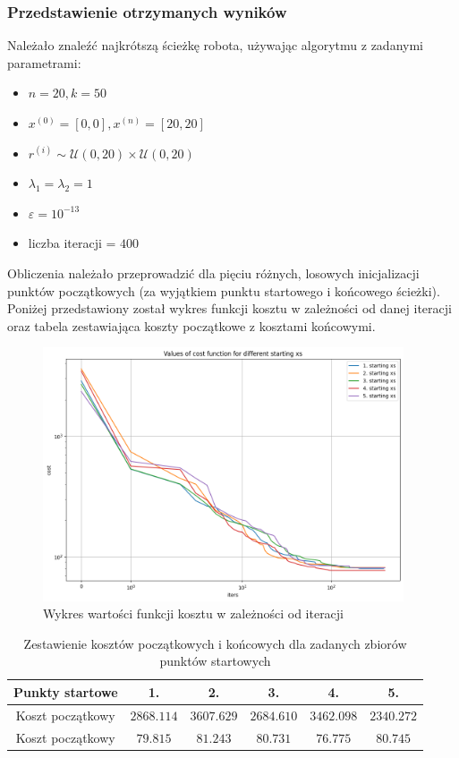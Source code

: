 \documentclass{article}
\begin{document}
\subsubsection{Przedstawienie otrzymanych wyników}
Należało znaleźć najkrótszą ścieżkę robota, używając algorytmu z zadanymi parametrami:
\begin{itemize}
\item $n=20, k=50$
\item $x^{(0)} = [0,0], x^{(n)} = [20,20]$
\item $r^{(i)} \sim \mathcal U(0,20) \times \mathcal U(0,20)$
\item $\lambda_1 = \lambda_2 = 1$
\item $\varepsilon = 10^{-13}$
\item liczba iteracji = $400$
\end{itemize}
Obliczenia należało przeprowadzić dla pięciu różnych, losowych inicjalizacji punktów początkowych (za wyjątkiem punktu startowego i końcowego ścieżki). Poniżej przedstawiony został wykres funkcji kosztu w zależności od danej iteracji oraz tabela zestawiająca koszty początkowe z kosztami końcowymi.
\begin{figure}[H]
    \centering
    \includegraphics[width=0.95\textwidth]{1}
    \caption{Wykres wartości funkcji kosztu w zależności od iteracji}
    \label{fig:mesh}
\end{figure}
\begin{table}[h!]
    \centering
    \begin{tabular}{|c|ccccc|}
        \hline
        Punkty startowe & 1. & 2. & 3. & 4. & 5. \\
        \hline
        Koszt początkowy & $2868.114$ & $3607.629$ & $2684.610$ & $3462.098$ & $2340.272$ \\
        Koszt początkowy & $79.815$ & $81.243$ & $80.731$ & $76.775$ & $80.745$ \\
        \hline
    \end{tabular}
    \caption{Zestawienie kosztów początkowych i końcowych dla zadanych zbiorów punktów startowych}
    \label{table}
\end{table}
\end{document}
